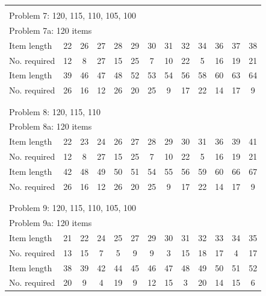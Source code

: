 \documentclass[a4paper]{article}
\begin{document}
\begin{table}[http]
    \centering
    \small
    \begin{tabular}{lcccccccccccc}
        \\
        \hline
        \\
        \multicolumn{13}{l}{Problem 7: 120, 115, 110, 105, 100} \\
        \multicolumn{13}{l}{Problem 7a: 120 \quad 200 items} \\
        \midrule
        Item length & 22 & 26 & 27 & 28 & 29 & 30 & 31 & 32 & 34 & 36 & 37 & 38 \\
        No. required & 12 & 8 & 27 & 15 & 25 & 7 & 10 & 22 & 5 & 16 & 19 & 21 \\
        Item length & 39 & 46 & 47 & 48 & 52 & 53 & 54 & 56 & 58 & 60 & 63 & 64 \\
        No. required & 26 & 16 & 12 & 26 & 20 & 25 & 9 & 17 & 22 & 14 & 17 & 9 \\
        \\
        \hline
        \\
        \toprule
        \multicolumn{13}{l}{Problem 8: 120, 115, 110} \\
        \multicolumn{13}{l}{Problem 8a: 120 \quad 400 items} \\
        \midrule
        Item length & 22 & 23 & 24 & 26 & 27 & 28 & 29 & 30 & 31 & 36 & 39 & 41 \\ %
        No. required & 12 & 8 & 27 & 15 & 25 & 7 & 10 & 22 & 5 & 16 & 19 & 21 \\
        Item length & 42 & 48 & 49 & 50 & 51 & 54 & 55 & 56 & 59 & 60 & 66 & 67 \\
        No. required & 26 & 16 & 12 & 26 & 20 & 25 & 9 & 17 & 22 & 14 & 17 & 9 \\
        \toprule
        \\
        \hline
        \\
        \multicolumn{13}{l}{Problem 9: 120, 115, 110, 105, 100} \\
        \multicolumn{13}{l}{Problem 9a: 120 \quad 400 items} \\
        \midrule
        Item length & 21 & 22 & 24 & 25 & 27 & 29 & 30 & 31 & 32 & 33 & 34 & 35 \\
        No. required & 13 & 15 & 7 & 5 & 9 & 9 & 3 & 15 & 18 & 17 & 4 & 17 \\
        Item length & 38 & 39 & 42 & 44 & 45 & 46 & 47 & 48 & 49 & 50 & 51 & 52 \\
        No. required & 20 & 9 & 4 & 19 & 9 & 12 & 15 & 3 & 20 & 14 & 15 & 6 \\

\end{tabular}
\end{table}
\end{document}
